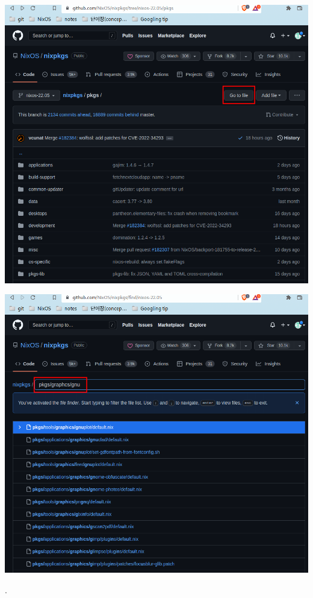\documentclass[a4paper,11pt]{article}
\begin{document}
\begin{center}
\includegraphics[width=.9\linewidth]{./img/3_nix/how to find packages_1.png}
\end{center}
\begin{center}
\includegraphics[width=.9\linewidth]{./img/3_nix/how to find packages_2.png}
\end{center}
.
\end{document}
